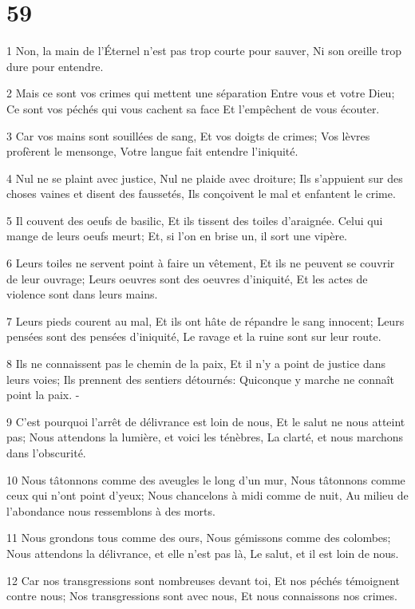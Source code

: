 \chapter{59}

\par 1 Non, la main de l'Éternel n'est pas trop courte pour sauver, Ni son oreille trop dure pour entendre.
\par 2 Mais ce sont vos crimes qui mettent une séparation Entre vous et votre Dieu; Ce sont vos péchés qui vous cachent sa face Et l'empêchent de vous écouter.
\par 3 Car vos mains sont souillées de sang, Et vos doigts de crimes; Vos lèvres profèrent le mensonge, Votre langue fait entendre l'iniquité.
\par 4 Nul ne se plaint avec justice, Nul ne plaide avec droiture; Ils s'appuient sur des choses vaines et disent des faussetés, Ils conçoivent le mal et enfantent le crime.
\par 5 Il couvent des oeufs de basilic, Et ils tissent des toiles d'araignée. Celui qui mange de leurs oeufs meurt; Et, si l'on en brise un, il sort une vipère.
\par 6 Leurs toiles ne servent point à faire un vêtement, Et ils ne peuvent se couvrir de leur ouvrage; Leurs oeuvres sont des oeuvres d'iniquité, Et les actes de violence sont dans leurs mains.
\par 7 Leurs pieds courent au mal, Et ils ont hâte de répandre le sang innocent; Leurs pensées sont des pensées d'iniquité, Le ravage et la ruine sont sur leur route.
\par 8 Ils ne connaissent pas le chemin de la paix, Et il n'y a point de justice dans leurs voies; Ils prennent des sentiers détournés: Quiconque y marche ne connaît point la paix. -
\par 9 C'est pourquoi l'arrêt de délivrance est loin de nous, Et le salut ne nous atteint pas; Nous attendons la lumière, et voici les ténèbres, La clarté, et nous marchons dans l'obscurité.
\par 10 Nous tâtonnons comme des aveugles le long d'un mur, Nous tâtonnons comme ceux qui n'ont point d'yeux; Nous chancelons à midi comme de nuit, Au milieu de l'abondance nous ressemblons à des morts.
\par 11 Nous grondons tous comme des ours, Nous gémissons comme des colombes; Nous attendons la délivrance, et elle n'est pas là, Le salut, et il est loin de nous.
\par 12 Car nos transgressions sont nombreuses devant toi, Et nos péchés témoignent contre nous; Nos transgressions sont avec nous, Et nous connaissons nos crimes.

